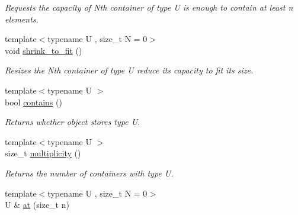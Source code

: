 \begin{DoxyCompactItemize}
\begin{DoxyCompactList}\small\item\em Requests the capacity of Nth container of type U is enough to contain at least n elements. \end{DoxyCompactList}\item 
\hypertarget{classheterogeneous_1_1heterovector_3_01_t_00_01_types_8_8_8_4_a226b721110b360b3bdd3840d25fed0ab}{}{\footnotesize template$<$typename U , size\+\_\+t N = 0$>$ }\\void \hyperlink{classheterogeneous_1_1heterovector_3_01_t_00_01_types_8_8_8_4_a226b721110b360b3bdd3840d25fed0ab}{shrink\+\_\+to\+\_\+fit} ()\label{classheterogeneous_1_1heterovector_3_01_t_00_01_types_8_8_8_4_a226b721110b360b3bdd3840d25fed0ab}

\begin{DoxyCompactList}\small\item\em Resizes the Nth container of type U reduce its capacity to fit its size. \end{DoxyCompactList}\item 
\hypertarget{classheterogeneous_1_1heterovector_3_01_t_00_01_types_8_8_8_4_a11ae03a75b58d7531452520c16565b5e}{}{\footnotesize template$<$typename U $>$ }\\bool \hyperlink{classheterogeneous_1_1heterovector_3_01_t_00_01_types_8_8_8_4_a11ae03a75b58d7531452520c16565b5e}{contains} ()\label{classheterogeneous_1_1heterovector_3_01_t_00_01_types_8_8_8_4_a11ae03a75b58d7531452520c16565b5e}

\begin{DoxyCompactList}\small\item\em Returns whether object stores type U. \end{DoxyCompactList}\item 
\hypertarget{classheterogeneous_1_1heterovector_3_01_t_00_01_types_8_8_8_4_a1f1b4c1c2d85e2c860724d3011480ba8}{}{\footnotesize template$<$typename U $>$ }\\size\+\_\+t \hyperlink{classheterogeneous_1_1heterovector_3_01_t_00_01_types_8_8_8_4_a1f1b4c1c2d85e2c860724d3011480ba8}{multiplicity} ()\label{classheterogeneous_1_1heterovector_3_01_t_00_01_types_8_8_8_4_a1f1b4c1c2d85e2c860724d3011480ba8}

\begin{DoxyCompactList}\small\item\em Returns the number of containers with type U. \end{DoxyCompactList}\item 
\hypertarget{classheterogeneous_1_1heterovector_3_01_t_00_01_types_8_8_8_4_a6b2715d99eb2c666db1e330394defb69}{}{\footnotesize template$<$typename U , size\+\_\+t N = 0$>$ }\\U \& \hyperlink{classheterogeneous_1_1heterovector_3_01_t_00_01_types_8_8_8_4_a6b2715d99eb2c666db1e330394defb69}{at} (size\+\_\+t n)\label{classheterogeneous_1_1heterovector_3_01_t_00_01_types_8_8_8_4_a6b2715d99eb2c666db1e330394defb69}


\end{DoxyCompactItemize}
